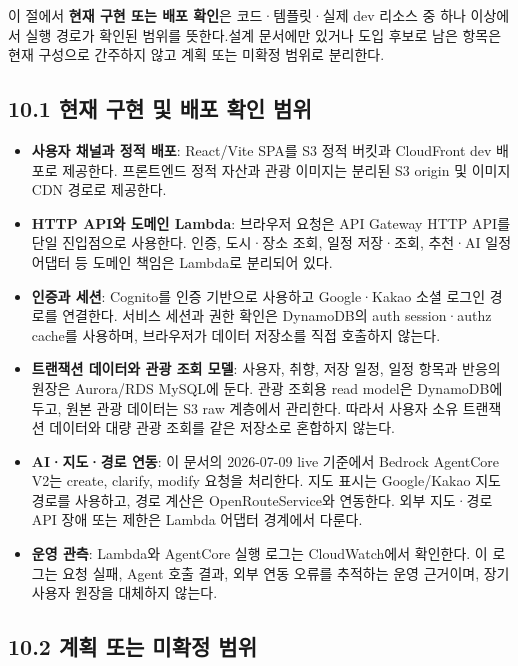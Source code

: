 \documentclass[12pt,a4paper]{article}
\newcommand{\DocNeedspace}[1]{\par\ifdim\dimexpr\pagegoal-\pagetotal\relax<#1\newpage\fi}
\begin{document}
\DocNeedspace{3\baselineskip}
이 절에서 \textbf{현재 구현 또는 배포 확인}은 코드·템플릿·실제 dev 리소스 중 하나 이상에서 실행 경로가 확인된 범위를 뜻한다.\newline 설계 문서에만 있거나 도입 후보로 남은 항목은 현재 구성으로 간주하지 않고 계획 또는 미확정 범위로 분리한다.


\DocNeedspace{16\baselineskip}
\subsection*{10.1 현재 구현 및 배포 확인 범위}

\begin{itemize}
\item \textbf{사용자 채널과 정적 배포}: React/Vite SPA를 S3 정적 버킷과 CloudFront dev 배포로 제공한다. 프론트엔드 정적 자산과 관광 이미지는 분리된 S3 origin 및 이미지 CDN 경로로 제공한다.
\item \textbf{HTTP API와 도메인 Lambda}: 브라우저 요청은 API Gateway HTTP API를 단일 진입점으로 사용한다. 인증, 도시·장소 조회, 일정 저장·조회, 추천·AI 일정 어댑터 등 도메인 책임은 Lambda로 분리되어 있다.
\item \textbf{인증과 세션}: Cognito를 인증 기반으로 사용하고 Google·Kakao 소셜 로그인 경로를 연결한다. 서비스 세션과 권한 확인은 DynamoDB의 auth session·authz cache를 사용하며, 브라우저가 데이터 저장소를 직접 호출하지 않는다.
\item \textbf{트랜잭션 데이터와 관광 조회 모델}: 사용자, 취향, 저장 일정, 일정 항목과 반응의 원장은 Aurora/RDS MySQL에 둔다. 관광 조회용 read model은 DynamoDB에 두고, 원본 관광 데이터는 S3 raw 계층에서 관리한다. 따라서 사용자 소유 트랜잭션 데이터와 대량 관광 조회를 같은 저장소로 혼합하지 않는다.
\item \textbf{AI·지도·경로 연동}: 이 문서의 2026-07-09 live 기준에서 Bedrock AgentCore V2는 create, clarify, modify 요청을 처리한다. 지도 표시는 Google/Kakao 지도 경로를 사용하고, 경로 계산은 OpenRouteService와 연동한다. 외부 지도·경로 API 장애 또는 제한은 Lambda 어댑터 경계에서 다룬다.
\item \textbf{운영 관측}: Lambda와 AgentCore 실행 로그는 CloudWatch에서 확인한다. 이 로그는 요청 실패, Agent 호출 결과, 외부 연동 오류를 추적하는 운영 근거이며, 장기 사용자 원장을 대체하지 않는다.
\end{itemize}

\DocNeedspace{15\baselineskip}
\subsection*{10.2 계획 또는 미확정 범위}
\end{document}
